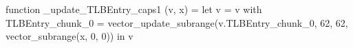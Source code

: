 function _update_TLBEntry_caps1 (v, x) = let v = { v with TLBEntry_chunk_0 = vector_update_subrange(v.TLBEntry_chunk_0, 62, 62, vector_subrange(x, 0, 0)) } in v
